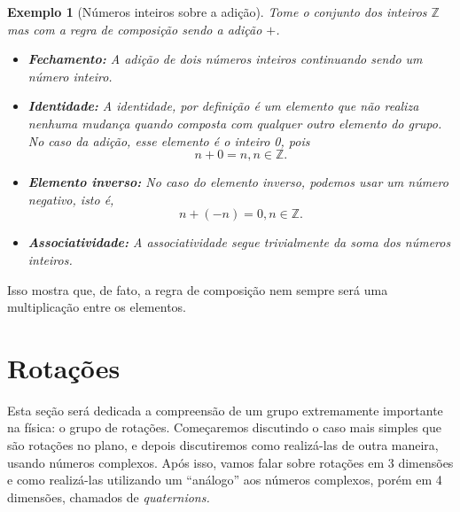 \documentclass{article}
\newtheorem{example}{Exemplo}[section]
\numberwithin{equation}{section}
\numberwithin{figure}{section}
\begin{document}
\begin{example}[Números inteiros sobre a adição]
Tome o conjunto dos inteiros $\mathbb{Z}$ mas com a regra de composição sendo a adição $+$. 
\begin{itemize}
	\item \textbf{Fechamento:} A adição de dois números inteiros continuando sendo um número inteiro. 
	\item \textbf{Identidade:} A identidade, por definição é um elemento que não realiza nenhuma mudança quando composta com qualquer outro elemento do grupo. No caso da adição, esse elemento é o inteiro 0, pois 
	$$
	n+0=n, n\in\mathbb{Z}.
	$$
	\item \textbf{Elemento inverso:} No caso do elemento inverso, podemos usar um número negativo, isto é, 
	$$
	n+(-n)=0,n\in\mathbb{Z}.
	$$
	\item \textbf{Associatividade:} A associatividade segue trivialmente da soma dos números inteiros. 
\end{itemize}
\end{example}
Isso mostra que, de fato, a regra de composição nem sempre será uma multiplicação entre os elementos. 
\section{Rotações}
Esta seção será dedicada a compreensão de um grupo extremamente importante na física: o grupo de rotações. Começaremos discutindo o caso mais simples que são rotações no plano, e depois discutiremos como realizá-las de outra maneira, usando números complexos. Após isso, vamos falar sobre rotações em 3 dimensões e como realizá-las utilizando um ``análogo'' aos números complexos, porém em 4 dimensões, chamados de \textit{quaternions.}
\end{document}
